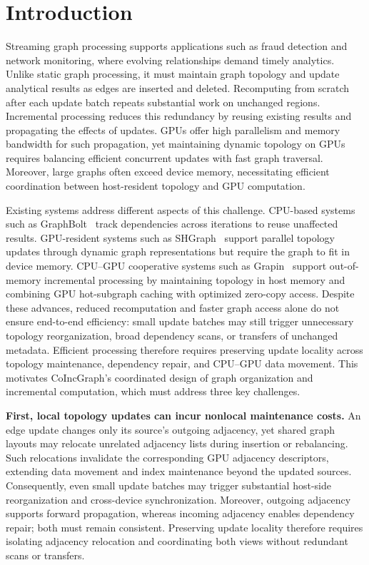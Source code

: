 \section{Introduction}
Streaming graph processing supports applications such as fraud detection and network monitoring, where evolving relationships demand timely analytics. Unlike static graph processing, it must maintain graph topology and update analytical results as edges are inserted and deleted. Recomputing from scratch after each update batch repeats substantial work on unchanged regions. Incremental processing reduces this redundancy by reusing existing results and propagating the effects of updates. GPUs offer high parallelism and memory bandwidth for such propagation, yet maintaining dynamic topology on GPUs requires balancing efficient concurrent updates with fast graph traversal. Moreover, large graphs often exceed device memory, necessitating efficient coordination between host-resident topology and GPU computation.

Existing systems address different aspects of this challenge. CPU-based systems such as GraphBolt~\cite{2019-GraphBolt} track dependencies across iterations to reuse unaffected results. GPU-resident systems such as SHGraph~\cite{2020-SHGraph} support parallel topology updates through dynamic graph representations but require the graph to fit in device memory. CPU--GPU cooperative systems such as Grapin~\cite{2025-Grapin} support out-of-memory incremental processing by maintaining topology in host memory and combining GPU hot-subgraph caching with optimized zero-copy access. Despite these advances, reduced recomputation and faster graph access alone do not ensure end-to-end efficiency: small update batches may still trigger unnecessary topology reorganization, broad dependency scans, or transfers of unchanged metadata. Efficient processing therefore requires preserving update locality across topology maintenance, dependency repair, and CPU--GPU data movement. This motivates CoIncGraph's coordinated design of graph organization and incremental computation, which must address three key challenges.

\textbf{First, local topology updates can incur nonlocal maintenance costs.}
An edge update changes only its source's outgoing adjacency, yet shared graph layouts may relocate unrelated adjacency lists during insertion or rebalancing. Such relocations invalidate the corresponding GPU adjacency descriptors, extending data movement and index maintenance beyond the updated sources. Consequently, even small update batches may trigger substantial host-side reorganization and cross-device synchronization. Moreover, outgoing adjacency supports forward propagation, whereas incoming adjacency enables dependency repair; both must remain consistent. Preserving update locality therefore requires isolating adjacency relocation and coordinating both views without redundant scans or transfers.

